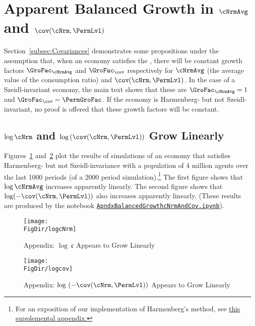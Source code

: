 \documentclass[\econtexRoot/Endo]{subfiles}
\begin{document}
\hypertarget{ApndxBalancedGrowthcNrmAndCov}{}
\section{Apparent Balanced Growth in \texorpdfstring{$\cNrmAvg$}{c} and \texorpdfstring{$\cov(\cNrm,\PermLvl)$}{cov(c,p)}}\label{sec:ApndxBalancedGrowthcNrmAndCov}


Section~\ref{subsec:Covariances} demonstrates some propositions under the assumption that, when an economy satisfies the {\GICRaw}, there will be constant growth factors $\GroFac_{\cNrmAvg}$ and $\GroFac_{\cov}$ respectively for $\cNrmAvg$ (the average value of the consumption ratio) and $\cov(\cNrm,\PermLvl)$.  In the case of a Szeidl-invariant economy, the main text shows that these are $\GroFac_{\cNrmAvg}=1$ and $\GroFac_{\cov}=\PermGroFac$.  If the economy is Harmenberg- but not Szeidl-invariant, no proof is offered that these growth factors will be constant.

\subsection{\texorpdfstring{$\log \cNrm$}{log c} and \texorpdfstring{$\log \left(\cov(\cNrm,\PermLvl)\right)$}{log cov(c,p)} Grow Linearly}
Figures~\ref{fig:logcNrm} and~\ref{fig:logcov} plot the results of simulations of an economy that satisfies Harmenberg- but not Szeidl-invariance with a population of 4 million agents over the last 1000 periods (of a 2000 period simulation).\footnote{For an exposition of our implementation of Harmenberg's method, see \href{https://github.com/econ-ark/Endo/blob/master/Appendices/ApndxHarKmenberg.pdf}{this supplemental appendix.}}  The first figure shows that $\log \cNrmAvg$ increases apparently linearly.  The second figure shows that $\log (-\cov(\cNrm,\PermLvl))$ also increases apparently linearly.  (These results are produced by the notebook \href{https://github.com/econ-ark/Endo/blob/master/Code/Python/ApndxBalancedGrowthcNrmAndCov.ipynb}{\texttt{ApndxBalancedGrowthcNrmAndCov.ipynb}}).

\pagebreak
\begin{figure}[ht]
  \centerline{
    \texttt{[image: \\FigDir/logcNrm]}
  }
  \caption{Appendix: $\log ~\mathfrak{c}$ Appears to Grow Linearly}\label{fig:logcNrm}
\end{figure}
\begin{figure}[ht]
  \centerline{
    \texttt{[image: \\FigDir/logcov]}
  }
  \caption{Appendix: $\log ~(-\cov(\cNrm,\PermLvl))$ Appears to Grow Linearly}\label{fig:logcov}
\end{figure}
\end{document}
